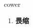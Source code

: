 
\begin{frame}
{\huge cower}
\begin{center}
\begin{enumerate}\Large
  \item \textbf{畏缩}
\end{enumerate}
\end{center}
\end{frame}
